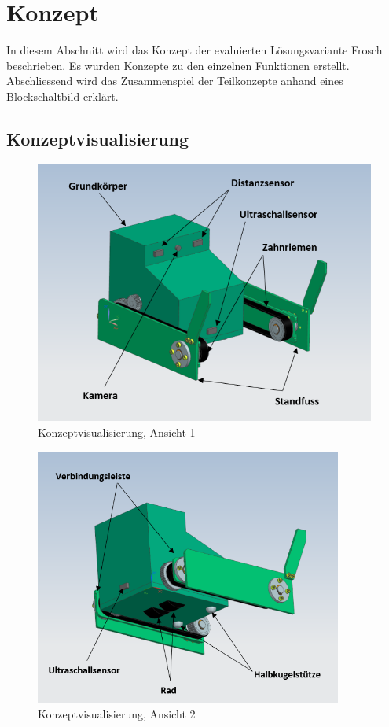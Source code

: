 \section{Konzept}
In diesem Abschnitt wird das Konzept der evaluierten Lösungsvariante \glqq Frosch\grqq{} beschrieben. Es wurden Konzepte zu den einzelnen Funktionen erstellt. Abschliessend wird das Zusammenspiel der Teilkonzepte anhand eines Blockschaltbild erklärt.

\subsection{Konzeptvisualisierung}

\begin{figure}[H]
  \includegraphics[width=1\textwidth]{img/Treppensteigen/Geraetansicht_final.PNG}
  \centering
  \caption{Konzeptvisualisierung, Ansicht 1}
\end{figure}

\begin{figure}[H]
  \includegraphics[width=0.9\textwidth]{img/Treppensteigen/Geraetansicht2_final.PNG}
  \centering
  \caption{Konzeptvisualisierung, Ansicht 2}
\end{figure}

